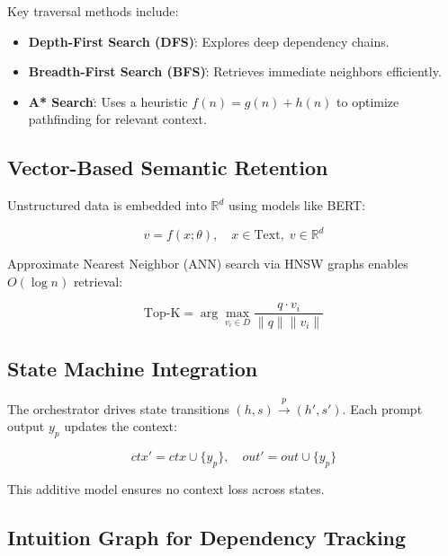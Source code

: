 \documentclass[11pt]{article}
\begin{document}
Key traversal methods include:

\begin{itemize}
  \item \textbf{Depth-First Search (DFS)}\.: Explores deep dependency chains.
  \item \textbf{Breadth-First Search (BFS)}\.: Retrieves immediate neighbors efficiently.
  \item \textbf{A* Search}\.: Uses a heuristic \(f(n)=g(n)+h(n)\) to optimize pathfinding for relevant context.
\end{itemize}

\subsection{Vector-Based Semantic Retention}
\label{subsec:vector_context}

Unstructured data is embedded into \(\mathbb{R}^d\) using models like BERT:

\[
v = f(x; \theta), \quad x\in\text{Text},\; v\in\mathbb{R}^d
\]

Approximate Nearest Neighbor (ANN) search via HNSW graphs enables \(O(\log n)\) retrieval:

\[
\text{Top-K} = \arg\max_{v_i\in D} \frac{q\cdot v_i}{\|q\|\|v_i\|}
\]

\subsection{State Machine Integration}
\label{subsec:state_machine}

The orchestrator drives state transitions \((h, s)\xrightarrow{p}(h', s')\). Each prompt output \(y_p\) updates the context:

\[
ctx' = ctx \cup \{y_p\},\quad out' = out \cup \{y_p\}
\]

This additive model ensures no context loss across states.

\subsection{Intuition Graph for Dependency Tracking}
\label{subsec:intuition_graph}
\end{document}

